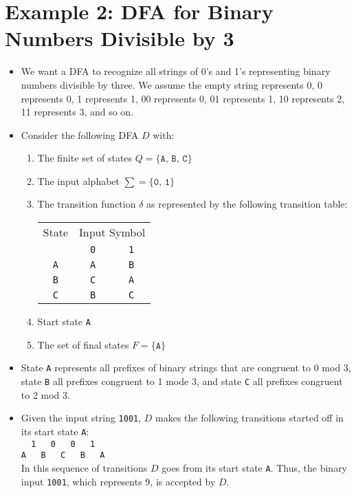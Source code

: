 \documentclass[]{article}
\begin{document}
\section{Example 2: DFA for Binary Numbers Divisible by 3}
  \begin{itemize}
    \item We want a DFA to recognize all strings of 0's and 1's representing 
    binary numbers divisible by three. We assume the empty string represents 0, 
    0 represents 0, 1 represents 1, 00 represents 0, 01 represents 1, 10 
    represents 2, 11 represents 3, and so on.
    \item Consider the following DFA $D$ with:
      \begin{enumerate}
        \item The finite set of states $Q = \{ \texttt{A, B, C} \}$
        \item The input alphabet $\sum = \{ \texttt{0, 1} \}$
        \item The transition function $\delta$ as represented by the following 
        transition table:
        
          \begin{tabular}{|c|c|c|}
            \hline
            State & \multicolumn{2}{|c|}{Input Symbol} \\ \cline{2-3}
                  & \texttt{0} & \texttt{1} \\ \hline
            \texttt{A} & \texttt{A} & \texttt{B} \\ \hline
            \texttt{B} & \texttt{C} & \texttt{A} \\ \hline
            \texttt{C} & \texttt{B} & \texttt{C} \\ \hline
          \end{tabular}    
        \item Start state \texttt{A}
        \item The set of final states $F = \{ \texttt{A} \}$
      \end{enumerate}
    \item State \texttt{A} represents all prefixes of binary strings that are 
    congruent to 0 mod 3, state \texttt{B} all prefixes congruent to 1 mode 3, 
    and state \texttt{C} all prefixes congruent to 2 mod 3.
    \item Given the input string \texttt{1001}, $D$ makes the following 
    transitions started off in its start state \texttt{A}:\\
    \verb|  1   0   0   1   | \\
    \verb|A   B   C   B   A | \\
    In this sequence of transitions $D$ goes from its start state \texttt{A}. 
    Thus, the binary input \texttt{1001}, which represents 9, is accepted by $D$.
  \end{itemize}
\end{document}
